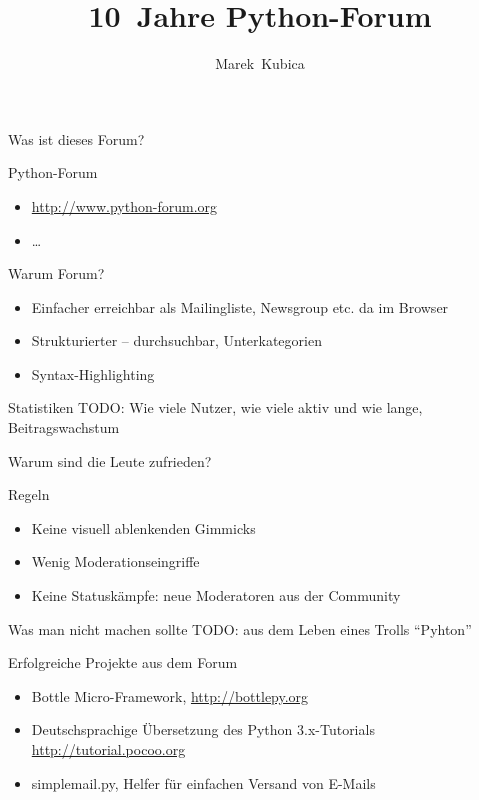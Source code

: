\documentclass{beamer}
\title{10~Jahre Python-Forum}
\author{Marek~Kubica}
\institute{PyCon DE 2012}
\begin{document}

\begin{frame}{Was ist dieses Forum?}
  \begin{block}{Python-Forum}
    \begin{itemize}
      \item \url{http://www.python-forum.org}
      \item …
    \end{itemize}
  \end{block}
  \begin{block}{Warum Forum?}
    \begin{itemize}
      \item Einfacher erreichbar als Mailingliste, Newsgroup etc. da im Browser
      \item Strukturierter -- durchsuchbar, Unterkategorien
      \item Syntax-Highlighting \smiley
    \end{itemize}
  \end{block}
\end{frame}

\begin{frame}{Statistiken}
  TODO: Wie viele Nutzer, wie viele aktiv und wie lange, Beitragswachstum
\end{frame}

\begin{frame}{Warum sind die Leute zufrieden?}
  \begin{block}{Regeln}
    \begin{itemize}
      \item Keine visuell ablenkenden Gimmicks
      \item Wenig Moderationseingriffe
      \item Keine Statuskämpfe: neue Moderatoren aus der Community
    \end{itemize}
  \end{block}
\end{frame}

\begin{frame}{Was man nicht machen sollte}
  TODO: aus dem Leben eines Trolls
  \enquote{Pyhton}
\end{frame}

\begin{frame}{Erfolgreiche Projekte aus dem Forum}
  \begin{itemize}
    \item Bottle Micro-Framework, \url{http://bottlepy.org}
    \item Deutschsprachige Übersetzung des Python 3.x-Tutorials \url{http://tutorial.pocoo.org}
    \item simplemail.py, Helfer für einfachen Versand von E-Mails
  \end{itemize}
\end{frame}
\end{document}
